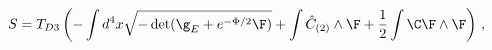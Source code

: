 \begin{equation}
S = T_{D3}\left( -\int d^4x \sqrt{-\det(\g_E+e^{-\Phi/2}\F)} 
    + \int\hat{C}_{(2)}\wedge\F + \frac{1}{2}\int \C\F\wedge\F \right)\,,
\end{equation}

